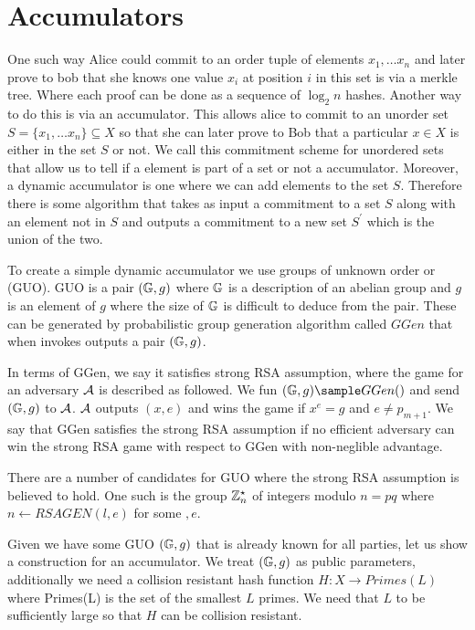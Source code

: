 \section{Accumulators}

One such way Alice could commit to an order tuple of elements \(x_1, \ldots x_n \) and later prove to bob that she knows one value \(x_i\) at position \(i\)  in this set is via a merkle tree. Where each proof can be done as a sequence of \(\log_2 n\) hashes. 
Another way to do this is via an accumulator. This allows alice to commit to an unorder set \(S= \{x_1, \ldots  x_n \} \subseteq X \) so that she can later prove to Bob that a particular \(x \in X\) is either in the set \(S\) or not. We call this commitment scheme for unordered sets that allow us to tell if a element is part of a set or not a accumulator.  Moreover, a dynamic accumulator is one where we can add elements to the set \(S\). Therefore  there is some algorithm that takes as input a commitment to a set \(S\) along with an element not in \(S\) and outputs a commitment to a new set \(S^\prime \) which is the union of the two. 

To create a simple dynamic accumulator we use groups of unknown order or (GUO). GUO is a pair \((\mathbb{G}, g)\) where \(\mathbb{G}\) is a description of an abelian group and \(g\) is an element of \(g\) where the size of \(\mathbb{G}\) is difficult to deduce from the pair.  These can be generated by probabilistic group generation algorithm called \(GGen\) that when invokes outputs a pair \((\mathbb{G}, g)\). 

In terms of GGen, we say it satisfies strong RSA assumption, where the game for an adversary \(\mathcal{A}\) is described as followed. We fun \((\G, g) \sample GGen()\) and send \((\mathbb{G}, g)\) to \(\mathcal{A}\).  \(\mathcal{A}\) outputs \((x,e)\) and wins the game if \(x^e =g\) and \(e \neq p_{m+1}\). We say that GGen satisfies the strong RSA assumption if no efficient adversary can win the strong RSA game with respect to GGen with non-neglible advantage. 

There are a number of candidates for GUO where the strong RSA assumption is  believed to hold. One such is the group \(\mathbb{Z}_n^{\star}\) of integers modulo \(n= pq\) where \( n \gets RSAGEN(l, e)\) for some \(, e\). 

Given we have some GUO \((\mathbb{G}, g)\) that is already known for all parties, let us show a construction for an accumulator. We treat \((\mathbb{G}, g)\) as public parameters, additionally we need a collision resistant hash function \(H: X \to Primes(L) \) where Primes(L) is the set of the smallest \(L\) primes. We need that \(L\) to be sufficiently large so that \(H\) can be collision resistant. 

